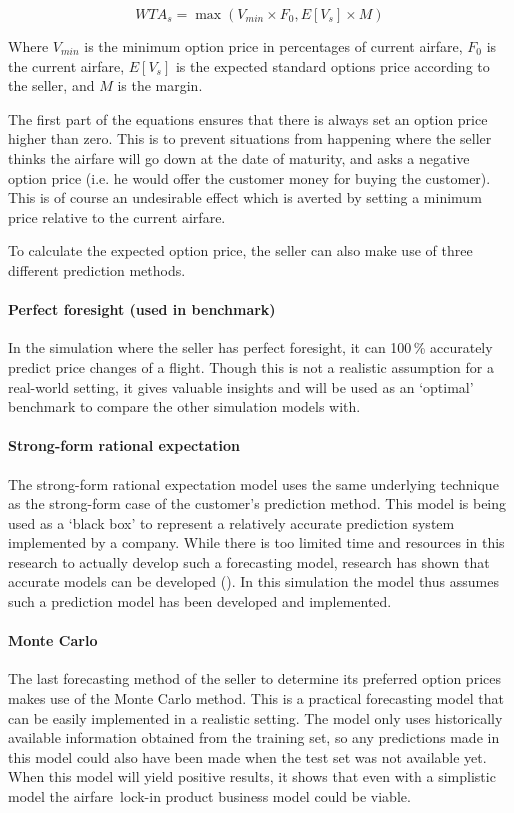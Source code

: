 $$ WTA_s = \max(V_{min} \times F_0, E[V_s] \times M) $$

Where $V_{min}$ is the minimum option price in percentages of current airfare, $F_0$ is the current airfare, $E[V_s]$ is the expected standard options price according to the seller, and $M$ is the margin.

The first part of the equations ensures that there is always set an option price higher than zero. This is to prevent situations from happening where the seller thinks the airfare will go down at the date of maturity, and asks a negative option price (i.e. he would offer the customer money for buying the customer). This is of course an undesirable effect which is averted by setting a minimum price relative to the current airfare.

To calculate the expected option price, the seller can also make use of three different prediction methods.

\paragraph{Perfect foresight (used in benchmark)}
In the simulation where the seller has perfect foresight, it can 100\,\% accurately predict price changes of a flight. Though this is not a realistic assumption for a real-world setting, it gives valuable insights and will be used as an `optimal' benchmark to compare the other simulation models with.

\paragraph{Strong-form rational expectation}
The strong-form rational expectation model uses the same underlying technique as the strong-form case of the customer's prediction method. This model is being used as a `black box' to represent a relatively accurate prediction system implemented by a company. While there is too limited time and resources in this research to actually develop such a forecasting model, research has shown that accurate models can be developed (). In this simulation the model thus assumes such a prediction model has been developed and implemented.

\paragraph{Monte Carlo}
The last forecasting method of the seller to determine its preferred option prices makes use of the Monte Carlo method. This is a practical forecasting model that can be easily implemented in a realistic setting. The model only uses historically available information obtained from the training set, so any predictions made in this model could also have been made when the test set was not available yet. When this model will yield positive results, it shows that even with a simplistic model the airfare~lock-in product business model could be viable.



